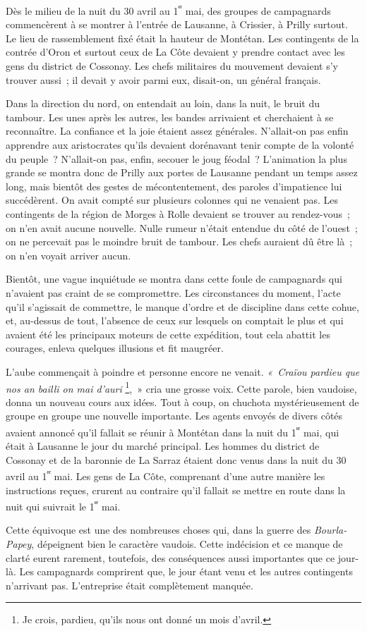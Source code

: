 \documentclass[french,twoside]{book} %
\begin{document}
\noindent Dès le milieu de la nuit du 30 avril au 1\textsuperscript{ᵉʳ} mai, des groupes de campagnards commencèrent à se montrer à l’entrée de Lausanne, à Crissier, à Prilly surtout. Le lieu de rassemblement fixé était la hauteur de Montétan. Les contingents de la contrée d’Oron et surtout ceux de La Côte devaient y prendre contact avec les gens du district de Cossonay. Les chefs militaires du mouvement devaient s’y trouver aussi ; il devait y avoir parmi eux, disait-on, un général français.\par
Dans la direction du nord, on entendait au loin, dans la nuit, le bruit du tambour. Les unes après les autres, les bandes arrivaient et cherchaient à se reconnaître. La confiance et la joie étaient assez générales. N’allait-on pas enfin apprendre aux aristocrates qu’ils devaient dorénavant tenir compte de la volonté du peuple ? N’allait-on pas, enfin, secouer le joug féodal ? L’animation la plus grande se montra donc de Prilly aux portes de Lausanne pendant un temps assez long, mais bientôt des gestes de mécontentement, des paroles d’impatience lui succédèrent. On avait compté sur plusieurs colonnes qui ne venaient pas. Les contingents de la région de Morges à Rolle devaient se trouver au rendez-vous ; on n’en avait aucune nouvelle. Nulle rumeur n’était entendue du côté de l’ouest ; on ne percevait pas le moindre bruit de tambour. Les chefs auraient dû être là ; on n’en voyait arriver aucun.\par
Bientôt, une vague inquiétude se montra dans cette foule de campagnards qui n’avaient pas craint de se compromettre. Les circonstances du moment, l’acte qu’il s’agissait de commettre, le manque d’ordre et de discipline dans cette cohue, et, au-dessus de tout, l’absence de ceux sur lesquels on comptait le plus et qui avaient été les principaux moteurs de cette expédition, tout cela abattit les courages, enleva quelques illusions et fit maugréer.\par
L’aube commençait à poindre et personne encore ne venait. \emph{« Craïou pardieu que nos an bailli on mai d’auri} \footnote{Je crois, pardieu, qu’ils nous ont donné un mois d’avril.}, » cria une grosse voix. Cette parole, bien vaudoise, donna un nouveau cours aux idées. Tout à coup, on chuchota mystérieusement de groupe en groupe une nouvelle importante. Les agents envoyés de divers côtés avaient annoncé qu’il fallait se réunir à Montétan dans la nuit du 1\textsuperscript{ᵉʳ} mai, qui était à Lausanne le jour du marché principal. Les hommes du district de Cossonay et de la baronnie de La Sarraz étaient donc venus dans la nuit du 30 avril au 1\textsuperscript{ᵉʳ} mai. Les gens de La Côte, comprenant d’une autre manière les instructions reçues, crurent au contraire qu’il fallait se mettre en route dans la nuit qui suivrait le 1\textsuperscript{ᵉʳ} mai.\par
Cette équivoque est une des nombreuses choses qui, dans la guerre des \emph{Bourla-Papey}, dépeignent bien le caractère vaudois. Cette indécision et ce manque de clarté eurent rarement, toutefois, des conséquences aussi importantes que ce jour-là. Les campagnards comprirent que, le jour étant venu et les autres contingents n’arrivant pas. L’entreprise était complètement manquée.\par
\end{document}
